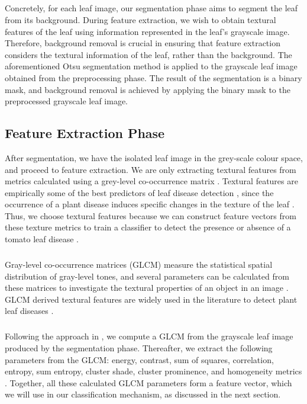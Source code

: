 \subparagraph{}
Concretely, for each leaf image, our segmentation phase aims to segment the leaf from its background. During feature extraction, we wish to obtain textural features of the leaf using information represented in the leaf's grayscale image. Therefore, background removal is crucial in ensuring that feature extraction considers the textural information of the leaf, rather than the background. The aforementioned Otsu segmentation method is applied to the grayscale leaf image obtained from the preprocessing phase. The result of the segmentation is a binary mask, and background removal is achieved by applying the binary mask to the preprocessed grayscale leaf image. 

\subsection{Feature Extraction Phase}
After segmentation, we have the isolated leaf image in the grey-scale colour space, and proceed to feature extraction. We are only extracting textural features from metrics calculated using a grey-level co-occurrence matrix \cite{haralickTexturalFeaturesImage1973}. Textural features are empirically some of the best predictors of leaf disease detection \cite{kimClassificationGrapefruitPeel, arivazhaganDetectionUnhealthyRegion2013}, since the occurrence of a plant disease induces specific changes in the texture of the leaf \cite{mokhtarSVMBasedDetectionTomato2015}. Thus, we choose textural features because we can construct feature vectors from these texture metrics to train a classifier to detect the presence or absence of a tomato leaf disease \cite{ahmedLeafImagebasedPlant2021, mokhtarSVMBasedDetectionTomato2015, arivazhaganDetectionUnhealthyRegion2013}.

\subparagraph{}
Gray-level co-occurrence matrices (GLCM) \cite{haralickTexturalFeaturesImage1973} measure the statistical spatial distribution of gray-level tones, and several parameters can be calculated from these matrices to investigate the textural properties of an object in an image \cite{argentiFastAlgorithmsTexture1990}. GLCM derived textural features are widely used in the literature to detect plant leaf diseases \cite{arivazhaganDetectionUnhealthyRegion2013, mokhtarSVMBasedDetectionTomato2015}.

\subparagraph{}
Following the approach in \cite{mokhtarSVMBasedDetectionTomato2015}, we compute a GLCM from the grayscale leaf image produced by the segmentation phase. Thereafter, we extract the following parameters from the GLCM: energy, contrast, sum of squares, correlation, entropy, sum entropy, cluster shade, cluster prominence, and homogeneity metrics \cite{arivazhaganDetectionUnhealthyRegion2013, haralickTexturalFeaturesImage1973, mokhtarSVMBasedDetectionTomato2015}. Together, all these calculated GLCM parameters form a feature vector, which we will use in our classification mechanism, as discussed in the next section.

